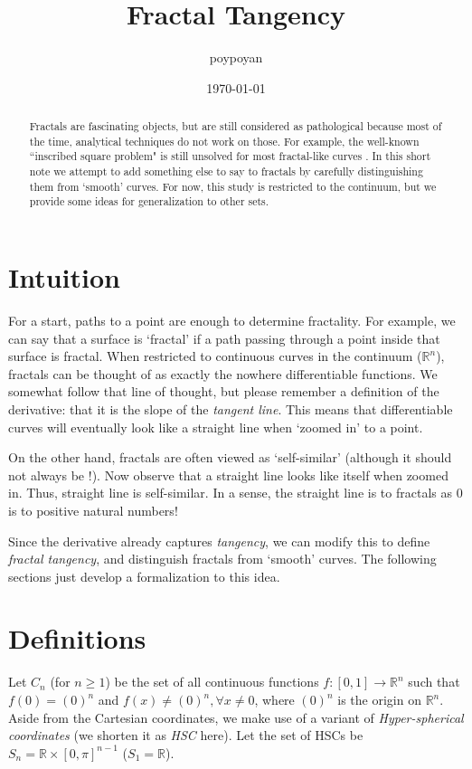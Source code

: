 \documentclass{article}
\title{Fractal Tangency}
\author{poypoyan}
\date{\petsa\today}
\theoremstyle{plain}
\begin{document}
\maketitle

\begin{abstract}
Fractals are fascinating objects, but are still considered as pathological because most of the time, analytical techniques do not work on those. For example, the well-known ``inscribed square problem" is still unsolved for most fractal-like curves \cite{square}. In this short note we attempt to add something else to say to fractals by carefully distinguishing them from `smooth' curves. For now, this study is restricted to the continuum, but we provide some ideas for generalization to other sets.
\end{abstract}

\section{Intuition}
For a start, paths to a point are enough to determine fractality. For example, we can say that a surface is `fractal' if a path passing through a point inside that surface is fractal. When restricted to continuous curves in the continuum ($\mathbb{R}^n$), fractals can be thought of as exactly the nowhere differentiable functions. We somewhat follow that line of thought, but please remember a definition of the derivative: that it is the slope of the \textit{tangent line}. This means that differentiable curves will eventually look like a straight line when `zoomed in' to a point.

On the other hand, fractals are often viewed as `self-similar' (although it should not always be \cite{3b1b}!). Now observe that a straight line looks like itself when zoomed in. Thus, straight line is self-similar. In a sense, the straight line is to fractals as 0 is to positive natural numbers!

Since the derivative already captures \textit{tangency}, we can modify this to define \textit{fractal tangency}, and distinguish fractals from `smooth' curves. The following sections just develop a formalization to this idea.

\section{Definitions}
Let $C_n$ (for $n \ge 1$) be the set of all continuous functions $f:[0,1]\rightarrow\mathbb{R}^n$ such that $f(0)=(0)^n$ and $f(x) \ne (0)^n, \forall x \ne 0$, where $(0)^n$ is the origin on $\mathbb{R}^n$. Aside from the Cartesian coordinates, we make use of a variant of \textit{Hyper-spherical coordinates} (we shorten it as \textit{HSC} here). Let the set of HSCs be $S_n = \mathbb{R} \times [0, \pi]^{n-1}$ ($S_1 = \mathbb{R}$).
\end{document}
